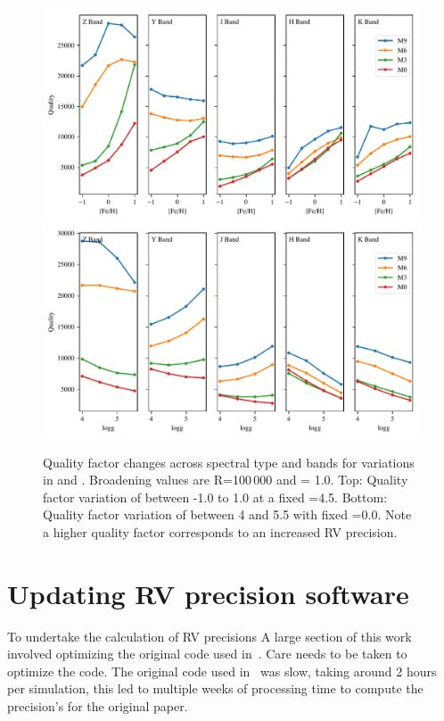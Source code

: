 \begin{figure}
\includegraphics[width=0.99\linewidth]{figures/information-content/metalicity_effect.pdf}\\
\includegraphics[width=0.99\linewidth]{figures/information-content/logg_effect.pdf}
\caption[Quality factor verse \feh{} and \Logg{} for different spectral types and wavelength bands.]{Quality factor changes across spectral type and bands for variations in \feh{} and \Logg{}.
Broadening values are R=100\,000 and \Vsini{} = 1.0\kmps{}.
Top: Quality factor variation of \feh{} between -1.0 to 1.0 at a fixed \Logg{}=4.5.
Bottom: Quality factor variation of \Logg{} between 4 and 5.5 with fixed \feh{}=0.0.
Note a higher quality factor corresponds to an increased {RV} precision.}
\label{fig:deviations}
\end{figure}


\clearpage

\section{Updating {RV} precision software}
To undertake the calculation of {RV} precisions
A large section of this work involved optimizing the original code used in~\citet{figueira_radial_2016}.
Care needs to be taken to optimize the code.
The original code used in~\citet{figueira_radial_2016} was slow, taking around 2 hours per simulation, this led to multiple weeks of processing time to compute the precision's for the original paper.

